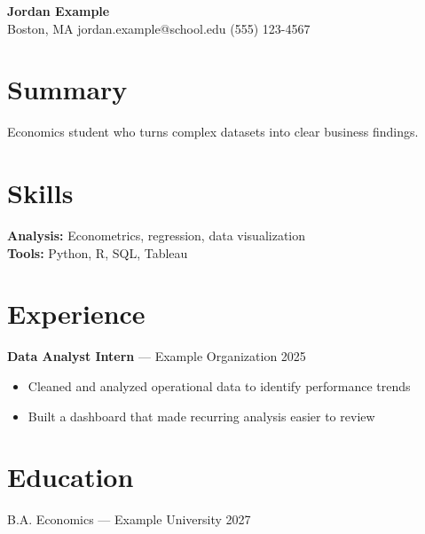 \documentclass[11pt]{article}
\begin{document}
\begin{center}
{\LARGE \textbf{Jordan Example}} \\
Boston, MA \quad jordan.example@school.edu \quad (555) 123-4567
\end{center}

\section*{Summary}
Economics student who turns complex datasets into clear business findings.

\section*{Skills}
\textbf{Analysis:} Econometrics, regression, data visualization \\
\textbf{Tools:} Python, R, SQL, Tableau

\section*{Experience}
\textbf{Data Analyst Intern} --- Example Organization \hfill 2025 \\
\begin{itemize}[nosep]
  \item Cleaned and analyzed operational data to identify performance trends
  \item Built a dashboard that made recurring analysis easier to review
\end{itemize}

\section*{Education}
B.A. Economics --- Example University \hfill 2027
\end{document}
